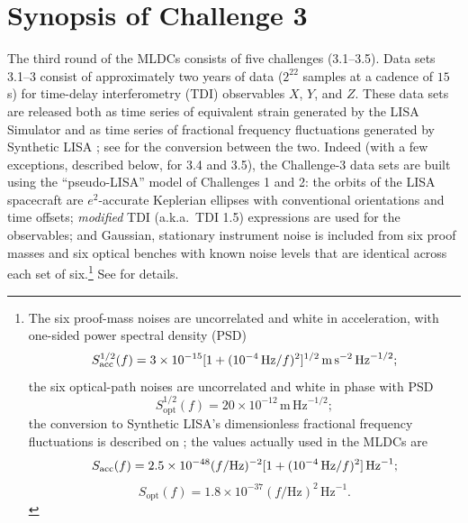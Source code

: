 \documentclass{iopart}
\begin{document}
\section{Synopsis of Challenge 3}
\label{s:challenge-3}

The third round of the MLDCs consists of five challenges (3.1--3.5). Data sets 3.1--3 consist of approximately two years of data ($2^{22}$ samples at a cadence of $15$ s) for time-delay interferometry (TDI) observables $X$, $Y$, and $Z$. These data sets are released both as time series of equivalent strain generated by the LISA Simulator \cite{lisasimulator} and as time series of fractional frequency fluctuations generated by Synthetic LISA \cite{synthlisa}; see \cite[p.\ S556]{mldcgwdaw2} for the conversion between the two. Indeed (with a few exceptions, described below, for 3.4 and 3.5), the Challenge-3 data sets are built using the ``pseudo-LISA'' model of Challenges 1 and 2: the orbits of the LISA spacecraft are $e^2$-accurate Keplerian ellipses with conventional orientations and time offsets; \emph{modified} TDI (a.k.a.\ TDI 1.5) expressions are used for the observables; and Gaussian, stationary instrument noise is included from six proof masses and six optical benches with known noise levels that are identical across each set of six.\footnote{The six proof-mass noises are uncorrelated and white in acceleration, with one-sided power spectral density (PSD)
%
\begin{displaymath}
S_\mathrm{acc}^{1/2}(f) = 3 \times 10^{-15} [1 + (10^{-4}\,{\rm Hz}/f)^2]^{1/2} \, \mathrm{m}\, \mathrm{s}^{-2}\, \mathrm{Hz}^{-1/2};
\end{displaymath}
%
the six optical-path noises are uncorrelated and white in phase with PSD
%
\begin{displaymath}
S_\mathrm{opt}^{1/2}(f) = 20 \times 10^{-12} \, \mathrm{m}\, \mathrm{Hz}^{-1/2};
\end{displaymath}
%
the conversion to Synthetic LISA's dimensionless fractional frequency fluctuations is described on \cite[p.\ 6]{synthlisa}; the values actually used in the MLDCs are
%
\begin{displaymath}
S_\mathrm{acc}(f) = 2.5 \times 10^{-48} (f/\mathrm{Hz})^{-2} [1 + (10^{-4}\,{\rm Hz}/f)^2] \, \mathrm{Hz}^{-1};
\end{displaymath}
\begin{displaymath}
S_\mathrm{opt}(f) = 1.8 \times 10^{-37} (f/\mathrm{Hz})^{2} \, \mathrm{Hz}^{-1}.
\end{displaymath}
} See \cite{mldcgwdaw2} for details.
\end{document}
